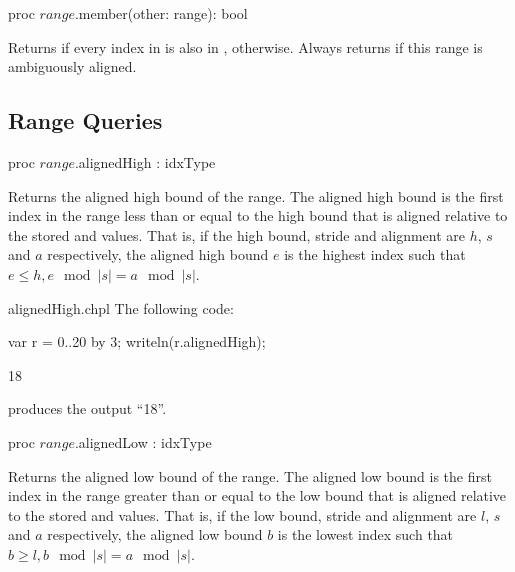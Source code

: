 \begin{protohead}
proc $range$.member(other: range): bool
\end{protohead}
\begin{protobody}
Returns  if every index in  is also in ,  otherwise.
Always returns  if this range is ambiguously aligned.
\end{protobody}

\subsection{Range Queries}
\label{Range_Queries}

\begin{protohead}
proc $range$.alignedHigh : idxType
\end{protohead}
\begin{protobody}
Returns the aligned high bound of the range.  
The aligned high bound is the first
index in the range less than or equal to the high bound that is
aligned relative to the stored  and  values.  That
is, if the high bound, stride and alignment are $h$, $s$ and $a$ respectively,
the aligned high bound $e$ is the highest index such that $e \leq h, e\!\mod |s| =
a\!\mod |s|$.
\end{protobody}
\begin{chapelexample}{alignedHigh.chpl}
The following code:
\begin{chapel}
var r = 0..20 by 3;
writeln(r.alignedHigh);
\end{chapel}
\begin{chapeloutput}
18
\end{chapeloutput}
produces the output ``18''.
\end{chapelexample}

\begin{protohead}
proc $range$.alignedLow : idxType
\end{protohead}
\begin{protobody}
Returns the aligned low bound of the range.  
The aligned low bound is the first
index in the range greater than or equal to the low bound that is
aligned relative to the stored  and  values.  That
is, if the low bound, stride and alignment are $l$, $s$ and $a$ respectively,
the aligned low bound $b$ is the lowest index such that $b \geq l, b\!\mod |s| =
a\!\mod |s|$.
\end{protobody}


